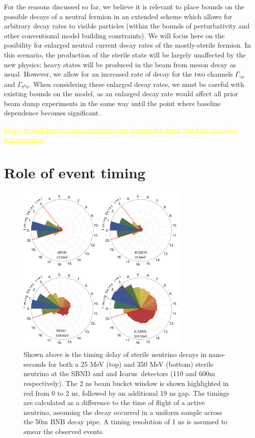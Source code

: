 \documentclass[11pt, a4paper]{article}
\def\icarus{Icarus}
\newcommand{\newtext}[2]{\textcolor{#1}{\ul{#2}}}
\begin{document}
For the reasons discussed so far, we believe it is relevant to place bounds on
the possible decays of a neutral fermion in an extended scheme which allows for
arbitrary decay rates to visible particles (within the bounds of perturbativity
and other conventional model building constraints).
%
We will focus here on the posibility for enlarged neutral current decay rates
of the mostly-sterile fermion. In this scenario, the production of the sterile
state will be largely unaffected by the new physics: heavy states will be
produced in the beam from meson decay as usual. However, we allow for an
increased rate of decay for the two channels $\Gamma_{\gamma\nu}$ and
$\Gamma_{\pi^0\nu}$.
%
When considering these enlarged decay rates, we must be careful with existing
bounds on the model, as an enlarged decay rate would affect all prior beam dump
experiments in the same way until the point where baseline dependence becomes
significant.

\newtext{MARK}{Going to add how to scale prexisting/our bounds for when you have an alpha enhancement.}

\section{\label{sec:timing}Role of event timing}


\begin{figure}[t]
%
\center
%
\includegraphics[width=0.75\textwidth]{figures/timing.pdf}
%
\caption{\label{fig:timing} Shown above is the timing delay of sterile neutrino
decays in nano-seconds for both a 25 MeV (top) and 350 MeV (bottom) sterile
neutrino at the SBND and and \icarus\ detectors (110 and 600m
respectively). The 2 ns beam bucket window is shown highlighted in red from 0
to 2 ns, followed by an additional 19 ns gap. The timings are calculated as a
difference to the time of flight of a active neutrino, assuming the decay
occurred in a uniform sample across the 50m BNB decay pipe. A timing resolution
of 1 ns is assumed to smear the observed events. }
%
\end{figure}
\end{document}
